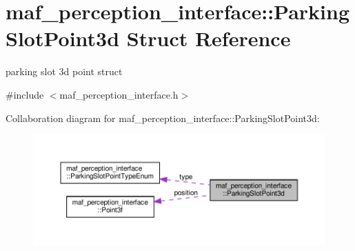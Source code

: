 \hypertarget{structmaf__perception__interface_1_1ParkingSlotPoint3d}{}\section{maf\+\_\+perception\+\_\+interface\+:\+:Parking\+Slot\+Point3d Struct Reference}
\label{structmaf__perception__interface_1_1ParkingSlotPoint3d}


parking slot 3d point struct  




{\ttfamily \#include $<$maf\+\_\+perception\+\_\+interface.\+h$>$}



Collaboration diagram for maf\+\_\+perception\+\_\+interface\+:\+:Parking\+Slot\+Point3d\+:\nopagebreak
\begin{figure}[H]
\begin{center}
\leavevmode
\includegraphics[width=350pt]{structmaf__perception__interface_1_1ParkingSlotPoint3d__coll__graph}
\end{center}
\end{figure}
